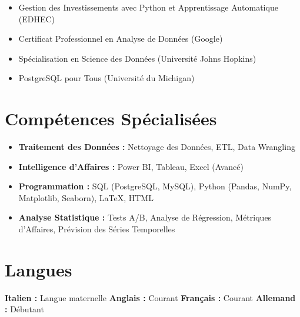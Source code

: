 \documentclass[letterpaper,10.5pt]{article}
\begin{document}
\begin{multicols}{2}
    \small
    \begin{itemize}[leftmargin=0.4 in, label={-}]
        \item Gestion des Investissements avec Python et Apprentissage Automatique (EDHEC)
        \item Certificat Professionnel en Analyse de Données (Google)
    \end{itemize}
    \begin{itemize}[leftmargin=0.3 in, label={-}]
        \item Spécialisation en Science des Données (Université Johns Hopkins)
        \item PostgreSQL pour Tous (Université du Michigan)
    \end{itemize}
\end{multicols}

\section*{Compétences Spécialisées}\vspace{-15pt}
\begin{multicols}{2}
\begin{itemize}[leftmargin=0.2in]
    \item \textbf{Traitement des Données :} Nettoyage des Données, ETL, Data Wrangling
    \item \textbf{Intelligence d'Affaires :} Power BI, Tableau, Excel (Avancé)
    \item \textbf{Programmation :} SQL (PostgreSQL, MySQL), Python (Pandas, NumPy, Matplotlib, Seaborn), LaTeX, HTML
    \item \textbf{Analyse Statistique :} Tests A/B, Analyse de Régression, Métriques d'Affaires, Prévision des Séries Temporelles
\end{itemize}
\end{multicols}

\section*{Langues}\vspace{-5pt}
\textbf{Italien :} Langue maternelle \hspace{20pt} \textbf{Anglais :} Courant \hspace{20pt} \textbf{Français :} Courant \hspace{20pt} \textbf{Allemand :} Débutant
\end{document}
